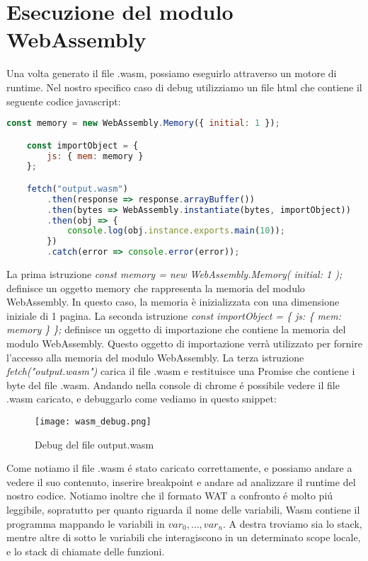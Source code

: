 \documentclass[../../main.tex]{subfiles}
\begin{document}
\section{Esecuzione del modulo WebAssembly}
Una volta generato il file .wasm, possiamo eseguirlo attraverso un motore di runtime. Nel nostro specifico caso di debug utilizziamo un file html che contiene il seguente codice javascript:
\begin{lstlisting}[language=Javascript, caption={Esecuzione del modulo WebAssembly}, label={lst:esecuzioneWasm}]
    const memory = new WebAssembly.Memory({ initial: 1 });

    const importObject = {
        js: { mem: memory }
    };

    fetch("output.wasm")
        .then(response => response.arrayBuffer())
        .then(bytes => WebAssembly.instantiate(bytes, importObject))
        .then(obj => {
            console.log(obj.instance.exports.main(10));
        })
        .catch(error => console.error(error));

\end{lstlisting}

La prima istruzione \textit{const memory = new WebAssembly.Memory({ initial: 1 });} definisce un oggetto memory che rappresenta la memoria del modulo WebAssembly. In questo caso, la memoria è inizializzata con una dimensione iniziale di 1 pagina.
La seconda istruzione \textit{const importObject = \{ js: \{ mem: memory \} \};} definisce un oggetto di importazione che contiene la memoria del modulo WebAssembly. Questo oggetto di importazione verrà utilizzato per fornire l'accesso alla memoria del modulo WebAssembly.
La terza istruzione \textit{fetch("output.wasm")} carica il file .wasm e restituisce una Promise che contiene i byte del file .wasm.
Andando nella console di chrome é possibile vedere il file .wasm caricato, e debuggarlo come vediamo in questo snippet:
\begin{figure}[H]
    \centering
    \texttt{[image: wasm\_debug.png]}
    \caption{Debug del file output.wasm}
    \label{fig:wasm_debug}
\end{figure}
Come notiamo il file .wasm é stato caricato correttamente, e possiamo andare a vedere il suo contenuto, inserire breakpoint e andare ad analizzare il runtime del nostro codice.
Notiamo inoltre che il formato WAT a confronto é molto piú leggibile, sopratutto per quanto riguarda il nome delle variabili, Wasm contiene il programma mappando le variabili in $var_0,\dots, var_n$.
A destra troviamo sia lo stack, mentre altre di sotto le variabili che interagiscono in un determinato scope locale, e lo stack di chiamate delle funzioni.
\end{document}
